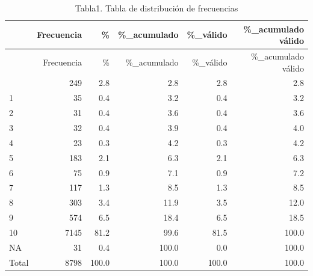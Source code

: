 \documentclass[
]{article}
\newenvironment{Shaded}{\begin{snugshade}}{\end{snugshade}}
\newcommand{\AttributeTok}[1]{\textcolor[rgb]{0.13,0.29,0.53}{#1}}
\newcommand{\CommentTok}[1]{\textcolor[rgb]{0.56,0.35,0.01}{\textit{#1}}}
\newcommand{\FunctionTok}[1]{\textcolor[rgb]{0.13,0.29,0.53}{\textbf{#1}}}
\newcommand{\NormalTok}[1]{#1}
\newcommand{\OtherTok}[1]{\textcolor[rgb]{0.56,0.35,0.01}{#1}}
\newcommand{\SpecialCharTok}[1]{\textcolor[rgb]{0.81,0.36,0.00}{\textbf{#1}}}
\newcommand{\StringTok}[1]{\textcolor[rgb]{0.31,0.60,0.02}{#1}}
\begin{document}
\begin{Shaded}
\end{Shaded}

\begin{longtable}[]{@{}lrrrrr@{}}
\caption{Tabla1. Tabla de distribución de frecuencias}\tabularnewline
\toprule\noalign{}
& Frecuencia & \% & \%\_acumulado & \%\_válido & \%\_acumulado válido \\
\midrule\noalign{}
\endfirsthead
\toprule\noalign{}
& Frecuencia & \% & \%\_acumulado & \%\_válido & \%\_acumulado válido \\
\midrule\noalign{}
\endhead
\bottomrule\noalign{}
\endlastfoot
0 & 249 & 2.8 & 2.8 & 2.8 & 2.8 \\
1 & 35 & 0.4 & 3.2 & 0.4 & 3.2 \\
2 & 31 & 0.4 & 3.6 & 0.4 & 3.6 \\
3 & 32 & 0.4 & 3.9 & 0.4 & 4.0 \\
4 & 23 & 0.3 & 4.2 & 0.3 & 4.2 \\
5 & 183 & 2.1 & 6.3 & 2.1 & 6.3 \\
6 & 75 & 0.9 & 7.1 & 0.9 & 7.2 \\
7 & 117 & 1.3 & 8.5 & 1.3 & 8.5 \\
8 & 303 & 3.4 & 11.9 & 3.5 & 12.0 \\
9 & 574 & 6.5 & 18.4 & 6.5 & 18.5 \\
10 & 7145 & 81.2 & 99.6 & 81.5 & 100.0 \\
NA & 31 & 0.4 & 100.0 & 0.0 & 100.0 \\
Total & 8798 & 100.0 & 100.0 & 100.0 & 100.0 \\
\end{longtable}
\end{document}
